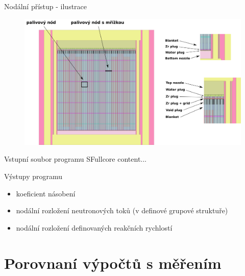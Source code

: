 \documentclass{beamer}
\begin{document}


\begin{frame}{Nodální přístup - ilustrace}
\begin{figure}
	\centering
	\includegraphics[scale=0.35]{img/reactor_axial_schema.png}
\end{figure}
\end{frame}

\begin{frame}{Vstupní soubor programu SFullcore}
	content...
\end{frame}

\begin{frame}{Výstupy programu}
\begin{itemize}\footnotesize
	\item koeficient násobení
	\item nodální rozložení neutronových toků (v definové grupové struktuře)
	\item nodální rozložení definovaných reakčních rychlostí
\end{itemize}	
	
\end{frame}

\section{Porovnaní výpočtů s měřením}
\end{document}
